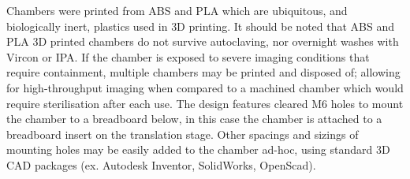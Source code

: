 Chambers were printed from ABS and PLA which are ubiquitous, and biologically inert, plastics used in \gls{3D printing}.
It should be noted that ABS and PLA 3D printed chambers do not survive autoclaving, nor overnight washes with Vircon or IPA.
If the chamber is exposed to severe imaging conditions that require containment, multiple chambers may be printed and disposed of; allowing for high-throughput imaging when compared to a machined chamber which would require sterilisation after each use.
The design features cleared M6 holes to mount the chamber to a breadboard below, in this case the chamber is attached to a breadboard insert on the translation stage.
Other spacings and sizings of mounting holes may be easily added to the chamber ad-hoc, using standard \gls{3D} \gls{CAD} packages (ex. Autodesk Inventor, SolidWorks, OpenScad).
